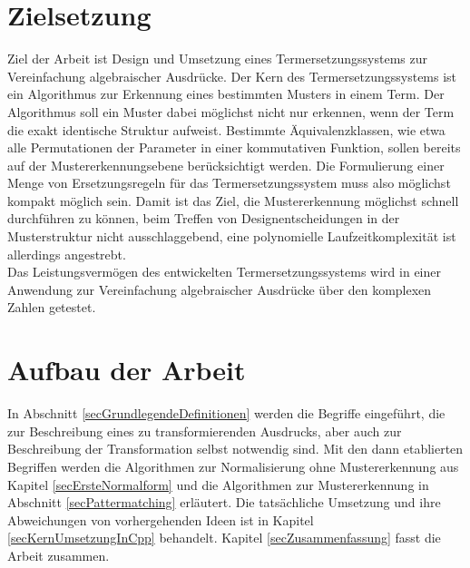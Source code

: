\section{Zielsetzung}
Ziel der Arbeit ist Design und Umsetzung eines Termersetzungssystems zur Vereinfachung algebraischer Ausdrücke. Der Kern des Termersetzungssystems ist ein Algorithmus zur Erkennung eines bestimmten Musters in einem Term. 
Der Algorithmus soll ein Muster dabei möglichst nicht nur erkennen, wenn der Term die exakt identische Struktur aufweist. Bestimmte Äquivalenzklassen, wie etwa alle Permutationen der Parameter in einer kommutativen Funktion, sollen bereits auf der Mustererkennungsebene berücksichtigt werden. Die Formulierung einer Menge von Ersetzungsregeln für das Termersetzungssystem muss also möglichst kompakt möglich sein. 
Damit ist das Ziel, die Mustererkennung möglichst schnell durchführen zu können, beim Treffen von Designentscheidungen in der Musterstruktur nicht ausschlaggebend, eine polynomielle Laufzeitkomplexität ist allerdings angestrebt.\\
Das Leistungsvermögen des entwickelten Termersetzungssystems wird in einer Anwendung zur Vereinfachung algebraischer Ausdrücke über den komplexen Zahlen getestet. 

\section{Aufbau der Arbeit}
In Abschnitt \ref{secGrundlegendeDefinitionen} werden die Begriffe eingeführt, die zur Beschreibung eines zu transformierenden Ausdrucks, aber auch zur Beschreibung der Transformation selbst notwendig sind. Mit den dann etablierten Begriffen werden die Algorithmen zur Normalisierung ohne Mustererkennung aus Kapitel \ref{secErsteNormalform} und die Algorithmen zur Mustererkennung in Abschnitt \ref{secPattermatching} erläutert. 
Die tatsächliche Umsetzung und ihre Abweichungen von vorhergehenden Ideen ist in Kapitel \ref{secKernUmsetzungInCpp} behandelt. 
Kapitel \ref{secZusammenfassung} fasst die Arbeit zusammen.



